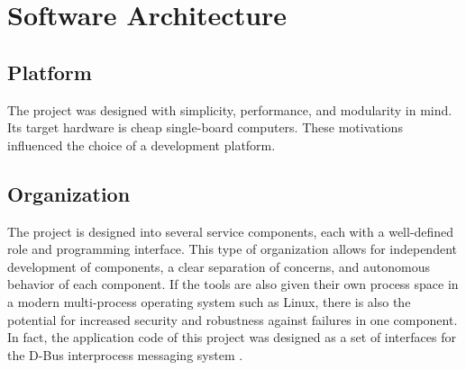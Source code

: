 

\section{Software Architecture}

\subsection{Platform}

The project was designed with simplicity, performance, and modularity in mind.
Its target hardware is cheap single-board computers.
These motivations influenced the choice of a development platform.

\subsection{Organization}

The project is designed into several service components, each with a well-defined role and programming interface.
This type of organization allows for independent development of components, a clear separation of concerns, and autonomous behavior of each component.
If the tools are also given their own process space in a modern multi-process operating system such as Linux, there is also the potential for increased security and robustness against failures in one component.
In fact, the application code of this project was designed as a set of interfaces for the D-Bus interprocess messaging system \cite{dbus}.


